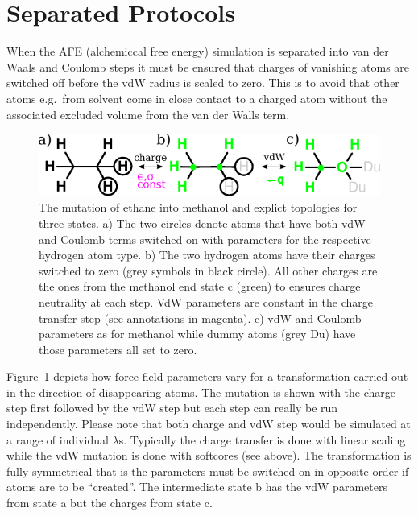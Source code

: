 \documentclass[journal=jctcce,manuscript=suppinfo]{achemso}
\begin{document}
\section{Separated Protocols}

When the AFE (alchemiccal free energy) simulation is separated into van
der Waals and Coulomb steps it must be ensured that charges of
vanishing atoms are switched off before the vdW radius is scaled to
zero.  This is to avoid that other atoms e.g.\ from solvent come in
close contact to a charged atom without the associated excluded volume
from the van der Walls term.

\begin{figure}[ht]
\includegraphics[scale=1.0]{figures/dummies.pdf}
\caption{The mutation of ethane into methanol and explict topologies
  for three states. a) The two circles denote atoms that have both vdW
  and Coulomb terms switched on with parameters for the respective
  hydrogen atom type.  b) The two hydrogen atoms have their charges
  switched to zero (grey symbols in black circle).  All other charges
  are the ones from the methanol end state c (green) to ensures charge
  neutrality at each step.  VdW parameters are constant in the charge
  transfer step (see annotations in magenta).  c) vdW and Coulomb
  parameters as for methanol while dummy atoms (grey Du) have those
  parameters all set to zero.}
\label{fig:dummies}
\end{figure}

Figure~\ref{fig:dummies} depicts how force field parameters vary for a
transformation carried out in the direction of disappearing atoms.
The mutation is shown with the charge step first followed by the vdW
step but each step can really be run independently.  Please note that
both charge and vdW step would be simulated at a range of individual
$\lambda$s.  Typically the charge transfer is done with linear scaling
while the vdW mutation is done with softcores (see above).  The
transformation is fully symmetrical that is the parameters must be
switched on in opposite order if atoms are to be ``created''.  The
intermediate state b has the vdW parameters from state a but the
charges from state c.
\end{document}
